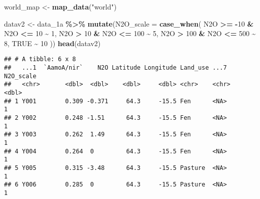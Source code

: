 \documentclass[
]{article}
\newenvironment{Shaded}{\begin{snugshade}}{\end{snugshade}}
\newcommand{\AttributeTok}[1]{\textcolor[rgb]{0.13,0.29,0.53}{#1}}
\newcommand{\ConstantTok}[1]{\textcolor[rgb]{0.56,0.35,0.01}{#1}}
\newcommand{\DecValTok}[1]{\textcolor[rgb]{0.00,0.00,0.81}{#1}}
\newcommand{\FunctionTok}[1]{\textcolor[rgb]{0.13,0.29,0.53}{\textbf{#1}}}
\newcommand{\NormalTok}[1]{#1}
\newcommand{\OtherTok}[1]{\textcolor[rgb]{0.56,0.35,0.01}{#1}}
\newcommand{\SpecialCharTok}[1]{\textcolor[rgb]{0.81,0.36,0.00}{\textbf{#1}}}
\newcommand{\StringTok}[1]{\textcolor[rgb]{0.31,0.60,0.02}{#1}}
\begin{document}
\begin{Shaded}
\begin{Highlighting}[]
\NormalTok{world\_map }\OtherTok{\textless{}{-}} \FunctionTok{map\_data}\NormalTok{(}\StringTok{"world"}\NormalTok{)}

\NormalTok{datav2 }\OtherTok{\textless{}{-}}\NormalTok{ data\_1a }\SpecialCharTok{\%\textgreater{}\%}
  \FunctionTok{mutate}\NormalTok{(}\AttributeTok{N2O\_scale =} \FunctionTok{case\_when}\NormalTok{(}
    \StringTok{\textasciigrave{}}\AttributeTok{N2O}\StringTok{\textasciigrave{}} \SpecialCharTok{\textgreater{}=} \SpecialCharTok{{-}}\DecValTok{10} \SpecialCharTok{\&} \StringTok{\textasciigrave{}}\AttributeTok{N2O}\StringTok{\textasciigrave{}} \SpecialCharTok{\textless{}=} \DecValTok{10} \SpecialCharTok{\textasciitilde{}} \DecValTok{1}\NormalTok{,    }
    \StringTok{\textasciigrave{}}\AttributeTok{N2O}\StringTok{\textasciigrave{}} \SpecialCharTok{\textgreater{}} \DecValTok{10} \SpecialCharTok{\&} \StringTok{\textasciigrave{}}\AttributeTok{N2O}\StringTok{\textasciigrave{}} \SpecialCharTok{\textless{}=} \DecValTok{100} \SpecialCharTok{\textasciitilde{}} \DecValTok{5}\NormalTok{,    }
    \StringTok{\textasciigrave{}}\AttributeTok{N2O}\StringTok{\textasciigrave{}} \SpecialCharTok{\textgreater{}} \DecValTok{100} \SpecialCharTok{\&} \StringTok{\textasciigrave{}}\AttributeTok{N2O}\StringTok{\textasciigrave{}} \SpecialCharTok{\textless{}=} \DecValTok{500} \SpecialCharTok{\textasciitilde{}} \DecValTok{8}\NormalTok{,   }
    \ConstantTok{TRUE} \SpecialCharTok{\textasciitilde{}} \DecValTok{10}                        
\NormalTok{  ))}
\FunctionTok{head}\NormalTok{(datav2)}
\end{Highlighting}
\end{Shaded}

\begin{verbatim}
## # A tibble: 6 x 8
##   ...1  `AamoA/nir`    N2O Latitude Longitude Land_use ...7  N2O_scale
##   <chr>       <dbl>  <dbl>    <dbl>     <dbl> <chr>    <chr>     <dbl>
## 1 Y001        0.309 -0.371     64.3     -15.5 Fen      <NA>          1
## 2 Y002        0.248 -1.51      64.3     -15.5 Fen      <NA>          1
## 3 Y003        0.262  1.49      64.3     -15.5 Fen      <NA>          1
## 4 Y004        0.264  0         64.3     -15.5 Fen      <NA>          1
## 5 Y005        0.315 -3.48      64.3     -15.5 Pasture  <NA>          1
## 6 Y006        0.285  0         64.3     -15.5 Pasture  <NA>          1
\end{verbatim}
\end{document}
